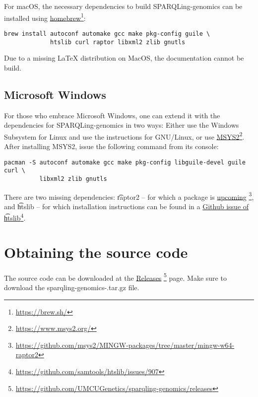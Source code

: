   For macOS, the necessary dependencies to build SPARQLing-genomics
  can be installed using
  \href{https://brew.sh/}{homebrew}\footnote{\url{https://brew.sh/}}:

\begin{siderules}
\begin{verbatim}
brew install autoconf automake gcc make pkg-config guile \
             htslib curl raptor libxml2 zlib gnutls
\end{verbatim}
\end{siderules}

  Due to a missing \LaTeX{} distribution on MacOS, the documentation
  cannot be build.

\subsection{Microsoft Windows}

  For those who embrace Microsoft Windows, one can extend it with the
  dependencies for SPARQLing-genomics in two ways: Either use the Windows
  Subsystem for Linux and use the instructions for GNU/Linux, or use
  \href{https://www.msys2.org/}{MSYS2}\footnote{\url{https://www.msys2.org/}}.
  After installing MSYS2, issue the following command from its console:

\begin{siderules}
\begin{verbatim}
pacman -S autoconf automake gcc make pkg-config libguile-devel guile curl \
          libxml2 zlib gnutls
\end{verbatim}
\end{siderules}

  There are two missing dependencies: \t{raptor2} -- for which a package is
  \href{https://github.com/msys2/MINGW-packages/tree/master/mingw-w64-raptor2}{upcoming}%
  \footnote{\url{https://github.com/msys2/MINGW-packages/tree/master/mingw-w64-raptor2}},
  and \t{htslib} -- for which installation instructions can be found in a
  \href{https://github.com/samtools/htslib/issues/907}{Github issue of
    \t{htslib}}\footnote{\url{https://github.com/samtools/htslib/issues/907}}.

\section{Obtaining the source code}
\label{sec:obtaining-tarball}

  \begin{sloppypar}
  The source code can be downloaded at the
  \href{https://github.com/UMCUGenetics/sparqling-genomics/releases}%
  {Releases}%
  \footnote{\url{https://github.com/UMCUGenetics/sparqling-genomics/releases}}
  page.  Make sure to download the {\fontfamily{\ttdefault}\selectfont
    sparqling-genomics-\sgversion{}.tar.gz} file.
  \end{sloppypar}

